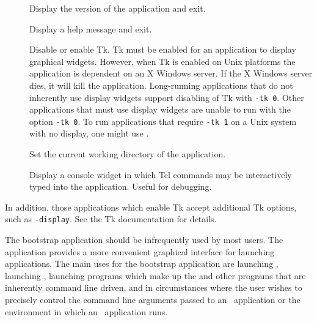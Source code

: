 \begin{description}
\item[]
Display the version of the application and exit.

\item[]
Display a help message and exit.

\item[]
Disable or enable Tk.  Tk must be enabled for an application to display
graphical widgets.  However, when Tk is enabled on Unix platforms
the application is dependent on an X Windows server.  If the 
X Windows server dies, it will kill the application.  Long-running
applications that do not inherently use display widgets support
disabling of Tk with \verb+-tk 0+.  
Other applications that must use display widgets are unable to run
with the option \verb+-tk 0+.  To run applications that require
\verb+-tk 1+ on a Unix system with no display, one might use
.

\item[]
Set the current working directory of the application.

\item[]
Display a console widget in which Tcl
commands may be interactively typed into the application.
Useful for debugging.
\end{description}

In addition, those applications which enable Tk accept additional Tk
options, such as \verb+-display+.  See the Tk documentation for details.

The bootstrap application should be infrequently used by most users.
The application  provides a more convenient graphical
interface for launching applications.  The main uses for the bootstrap
application are launching , launching ,
launching programs which make up the  and other programs
that are inherently command line driven, and in circumstances where
the user wishes to precisely control the command line arguments passed
to an \OOMMF\ application or the environment in which an \OOMMF\ application
runs.

